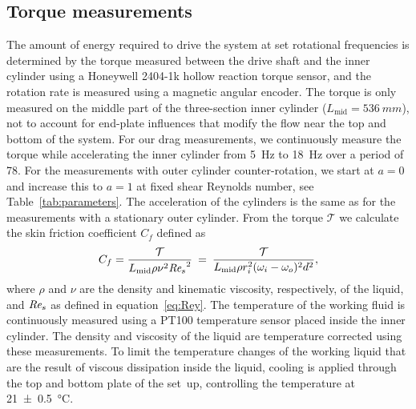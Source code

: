 \documentclass[aps,twocolumn,10pt,floatfix, superscriptaddress,longbibliography,pra]{revtex4-1}
\newcommand\Rey{\mbox{\textit{Re$_s$}}}  %
\begin{document}
\subsection{Torque measurements}
The amount of energy required to drive the system at set rotational frequencies is determined by the torque measured between the drive shaft and the inner cylinder using a Honeywell 2404-1k hollow reaction torque sensor, and the rotation rate is measured using a magnetic angular encoder. The torque is only measured on the middle part of the three-section inner cylinder ($L_\text{mid} = \SI{536}{mm}$), not to account for end-plate influences that modify the flow near the top and bottom of the system. For our drag measurements, we continuously measure the torque while accelerating the inner cylinder from \SI{5}{Hz} to \SI{18}{Hz} over a period of \SI{78}{\min}. For the measurements with outer cylinder counter-rotation, we start at $a=0$ and increase this to $a=1$ at fixed shear Reynolds number, see Table~\ref{tab:parameters}. The acceleration of the cylinders is the same as for the measurements with a stationary outer cylinder. From the torque $\mathcal{T}$ we calculate the skin friction coefficient $C_f$ defined as
\begin{equation}
    C_f = \frac{\mathcal{T}}{L_{\text{mid}}\rho\nu^2\Rey^2} \:=\: \frac{\mathcal{T}}{L_{\text{mid}}\rho r_i^2 (\omega_i - \omega_o)^2 d^2},
\end{equation}
where $\rho$ and $\nu$ are the density and kinematic viscosity, respectively, of the liquid, and $\Rey$ as defined in equation~\ref{eq:Rey}.
The temperature of the working fluid is continuously measured using a PT100 temperature sensor placed inside the inner cylinder. The density and viscosity of the liquid are temperature corrected using these measurements. To limit the temperature changes of the working liquid that are the result of viscous dissipation inside the liquid, cooling is applied through the top and bottom plate of the set~up, controlling the temperature at \SI{21 +- 0.5}{\celsius}.
\end{document}
